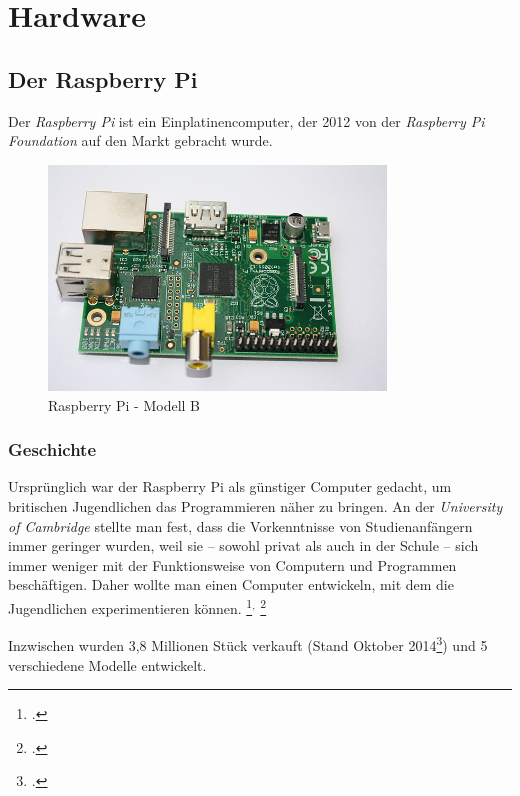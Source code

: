 \chapter{Hardware}
\label{cha:Hardware}

\section{Der Raspberry Pi}
\label{sec:Raspberry}
Der \emph{Raspberry Pi} ist ein Einplatinencomputer, der 2012 von der \emph{Raspberry Pi Foundation} auf den Markt gebracht wurde.

\begin{figure}[h]
  \centering
     \includegraphics[width=0.8\textwidth]{figures/raspberry.jpg}
 \caption[Raspberry Pi - Modell B]{Raspberry Pi - Modell B\footnotemark}
  \label{fig:raspberry}
\end{figure}

\subsection{Geschichte}
\label{subsec:Geschichte}
Ursprünglich war der Raspberry Pi als günstiger Computer gedacht, um britischen Jugendlichen das Programmieren näher zu bringen. An der \emph{University of Cambridge} stellte man fest, dass die Vorkenntnisse von Studienanfängern immer geringer wurden, weil sie -- sowohl privat als auch in der Schule -- sich immer weniger mit der Funktionsweise von Computern und Programmen beschäftigen. Daher wollte man einen Computer entwickeln, mit dem die Jugendlichen experimentieren können.
\footcite{aboutraspberry}$^,$
\footcite[Geschichte]{wiki:raspberry}

Inzwischen wurden 3,8 Millionen Stück verkauft (Stand Oktober 2014\footcite{verkauf}) und 5 verschiedene Modelle entwickelt.

